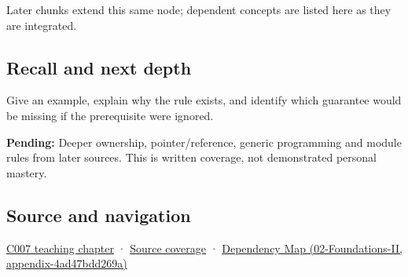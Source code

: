Later chunks extend this same node; dependent concepts are listed here as they are integrated.

\subsection{Recall and next depth}\label{appendix-806686359e1b-recall-and-next-depth}

Give an example, explain why the rule exists, and identify which guarantee would be missing if the prerequisite were ignored.

\textbf{Pending:} Deeper ownership, pointer/reference, generic programming and module rules from later sources. This is written coverage, not demonstrated personal mastery.

\subsection{Source and navigation}\label{appendix-806686359e1b-source-and-navigation}

\hyperref[01-foundations-i-ch002-giving-a-program-a-buildable-shape]{C007 teaching chapter} · \hyperref[appendix-fd090d982a15-m007---parts-101-112]{Source coverage} · \href{../02-Foundations-II/main.pdf\#nameddest=appendix-4ad47bdd269a}{Dependency Map (02-Foundations-II, appendix-4ad47bdd269a)}
